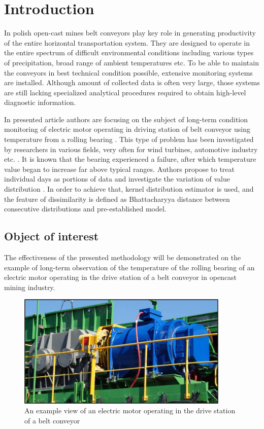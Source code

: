 \documentclass{svproc}
\begin{document}
\section{Introduction}

In polish open-cast mines belt conveyors play key role in generating productivity of the entire horizontal transportation system. They are designed to operate in the entire spectrum of difficult environmental conditions including various types of precipitation, broad range of ambient temperatures etc. To be able to maintain the conveyors in best technical condition possible, extensive monitoring systems are installed. Although amount of collected data is often very large, those systems are still lacking specialized analytical procedures required to obtain high-level diagnostic information.

In presented article authors are focusing on the subject of long-term condition monitoring of electric motor operating in driving station of belt conveyor using temperature from a rolling bearing \cite{wodecki2016condition,kruczek2017fault,wodecki2017technical}. This type of problem has been investigated by researchers in various fields, very often for wind turbines, automotive industry etc. \cite{sawicki2015automatic,yang2013data,guo2012wind,astolfi2014fault,yang2013wind,nembhard2013fault,crossman2003automotive,mana2017wind}. It is known that the bearing experienced a failure, after which temperature value began to increase far above typical ranges. Authors propose to treat individual days as portions of data and investigate the variation of value distribution \cite{wylomanska2015analysis}. In order to achieve that, kernel distribution estimator is used, and the feature of dissimilarity is defined as Bhattacharyya distance between consecutive distributions and pre-established model.

\subsection{Object of interest}

The effectiveness of the presented methodology will be demonstrated on the example of long-term observation of the temperature of the rolling bearing of an electric motor operating in the drive station of a belt conveyor in opencast mining industry. 

\begin{figure}[ht!]
\centering
\includegraphics[width=0.9\textwidth]{figs/fig01.jpg}
\caption{An example view of an electric motor operating in the drive station of a belt conveyor}
\label{fig:block}
\end{figure}
\end{document}
